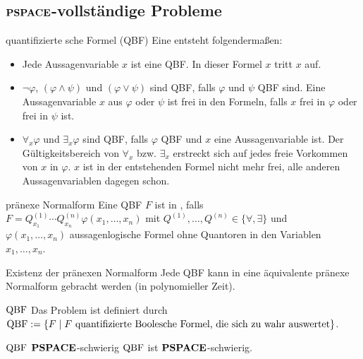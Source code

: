 \pagebreak

\subsection{%
    \texorpdfstring{$\mathbf{PSPACE}$}{PSPACE}-vollständige Probleme%
}

\begin{Def}{quantifizierte sche Formel (QBF)}
    Eine  entsteht folgendermaßen:
    \begin{itemize}
        \item
        Jede Aussagenvariable $x$ ist eine QBF.
        In dieser Formel $x$ tritt $x$  auf.

        \item
        $\lnot \varphi$, $(\varphi \land \psi)$ und $(\varphi \lor \psi)$ sind QBF,
        falls $\varphi$ und $\psi$ QBF sind.
        Eine Aussagenvariable $x$ aus $\varphi$ oder $\psi$ ist frei in den Formeln,
        falls $x$ frei in $\varphi$ oder frei in $\psi$ ist.

        \item
        $\forall_x \varphi$ und $\exists_x \varphi$ sind QBF,
        falls $\varphi$ QBF und $x$ eine Aussagenvariable ist.
        Der Gültigkeitsbereich von $\forall_x$ bzw. $\exists_x$ erstreckt sich auf jedes
        freie Vorkommen von $x$ in $\varphi$.
        $x$ ist in der entstehenden Formel nicht mehr frei,
        alle anderen Aussagenvariablen dagegen schon.
    \end{itemize}
\end{Def}

\begin{Def}{pränexe Normalform}
    Eine QBF $F$ ist in , falls\\
    $F = Q^{(1)}_{x_1} \dotsb Q^{(n)}_{x_n} \varphi(x_1, \dotsc, x_n)$ mit
    $Q^{(1)}, \dotsc, Q^{(n)} \in \{\forall, \exists\}$ und\\
    $\varphi(x_1, \dotsc, x_n)$ aussagenlogische Formel ohne Quantoren in den Variablen
    $x_1, \dotsc, x_n$.
\end{Def}

\begin{Satz}{Existenz der pränexen Normalform}
    Jede QBF kann in eine äquivalente pränexe Normalform gebracht werden
    (in polynomieller Zeit).
\end{Satz}

\linie

\begin{Def}{$\QBF$}
    Das Problem \begriff{$\QBF$} ist definiert durch\\
    $\text{QBF} := \{F \;|\; F \text{ quantifizierte Boolesche Formel, die sich zu wahr auswertet}\}$.
\end{Def}

\begin{Satz}{$\QBF$ $\mathbf{PSPACE}$-schwierig}
    $\QBF$ ist $\mathbf{PSPACE}$-schwierig.
\end{Satz}

\pagebreak
